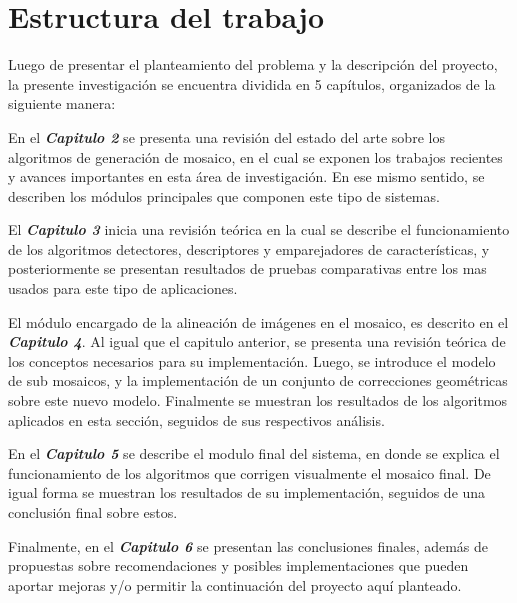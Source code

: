 \section{Estructura del trabajo}

Luego de presentar el planteamiento del problema y la descripción del proyecto, la presente investigación se encuentra dividida en 5 capítulos, organizados de la siguiente manera:

En el \textit{\textbf{Capitulo 2}} se presenta una revisión del estado del arte sobre los algoritmos de generación de mosaico, en el cual se exponen los trabajos recientes y avances importantes en esta área de investigación. En ese mismo sentido, se describen los módulos principales que componen este tipo de sistemas.

El \textit{\textbf{Capitulo 3}} inicia una revisión teórica en la cual se describe el funcionamiento de los algoritmos detectores, descriptores y emparejadores de características, y posteriormente se presentan resultados de pruebas comparativas entre los mas usados para este tipo de aplicaciones. 

El módulo encargado de la alineación de imágenes en el mosaico, es descrito en el \textit{\textbf{Capitulo 4}}. Al igual que el capitulo anterior, se presenta una revisión teórica de los conceptos necesarios para su implementación. Luego, se introduce el modelo de sub mosaicos, y la implementación de un conjunto de correcciones geométricas sobre este nuevo modelo. Finalmente se muestran los resultados de los algoritmos aplicados en esta sección, seguidos de sus respectivos análisis.

En el \textit{\textbf{Capitulo 5}} se describe el modulo final del sistema, en donde se explica el funcionamiento de los algoritmos que corrigen visualmente el mosaico final. De igual forma se muestran los resultados de su implementación, seguidos de una conclusión final sobre estos.

Finalmente, en el \textit{\textbf{Capitulo 6}} se presentan las conclusiones finales, además de propuestas sobre recomendaciones y posibles implementaciones que pueden aportar mejoras y/o permitir la continuación del proyecto aquí planteado.